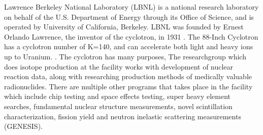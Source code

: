 Lawrence Berkeley National Laboratory (LBNL) \cite{KireeffCovo2018a}  is a national research laboratory on behalf of the U.S. Department of Energy through its Office of Science, and is operated by University of California, Berkeley. LBNL was founded by Ernest Orlando Lawrence, the inventor of the cyclotron, in 1931 \cite{webpage-lab-about}. The 88-Inch Cyclotron has a cyclotron number of K=140, and can accelerate both light and heavy ions up to Uranium.  \cite{webpage-lab}. The cyclotron has many purposes,  The researchgroup which does isotope production at the facility works with development of nuclear reaction data, along with researching production methods of medically valuable radionuclides. There are multiple other programs that takes place in the facility which include chip testing and space effects testing, super heavy element searches, fundamental nuclear structure measurements, novel scintillation characterization, fission yield and neutron inelastic scattering measurements (GENESIS). \\ %


